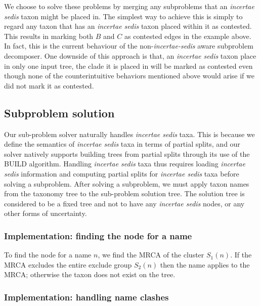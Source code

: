 \documentclass[english]{article}
\begin{document}
We choose to solve these problems by merging any subproblems that an
\emph{incertae sedis} taxon might be placed in.
The simplest way to
achieve this is simply to regard any taxon that has an \emph{incertae
sedis }taxon placed within it as contested.
This results in marking
both $B$ and $C$ as contested edges in the example above.
In fact,
this is the current behaviour of the non-\emph{incertae-sedis} aware
subproblem decomposer.
One downside of this approach is that, an \emph{incertae sedis} taxon
    place in only one input tree, the clade it is placed in will be
    marked as contested even though none of the counterintuitive
    behaviors mentioned above would arise if we did not
    mark it as contested.



\subsection{Subproblem solution}

Our sub-problem solver naturally handles \emph{incertae sedis} taxa.
This is because we define the semantics of \emph{incertae sedis} taxa
in terms of partial splits, and our solver natively supports building
trees from partial splits through its use of the BUILD algorithm.
Handling \emph{incertae sedis} taxa thus requires loading \emph{incertae
sedis} information and computing partial splits for \emph{incertae
sedis} taxa before solving a subproblem.
After solving a subproblem,
we must apply taxon names from the taxonomy tree to the sub-problem
solution tree.
The solution tree is considered to be a fixed tree and not
to have any \emph{incertae sedis} nodes, or any other forms of
uncertainty.


\subsubsection{Implementation: finding the node for a name}

To find the node for a name $n$, we find the MRCA of the cluster
$S_{1}(n)$.
If the MRCA excludes the entire exclude group $S_{2}(n)$
then the name applies to the MRCA; otherwise the taxon does not exist
on the tree.

\subsubsection{Implementation: handling name clashes}
\end{document}

